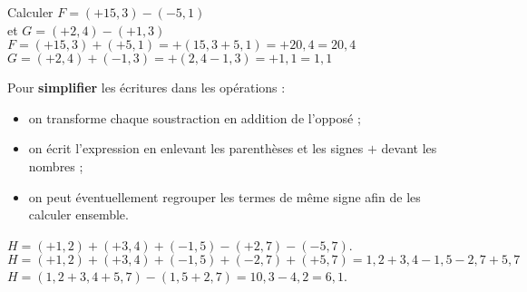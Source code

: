 \begin{exemple}
   Calculer $F =(+15,3)-(-5,1)$ \\
   et $G =(+2,4)-(+1,3)$
   \correction 
      $F =(+15,3)+(+5,1) =+(15,3+5,1) =+20,4 =20,4$ \\
      $G =(+2,4)+(-1,3) =+(2,4-1,3) =+1,1 =1,1$
\end{exemple}

\smallskip

\begin{methode*1}
   Pour {\bf simplifier} les écritures dans les opérations :
   \begin{itemize}
      \item on transforme chaque soustraction en addition de l'opposé ;
      \item on écrit l'expression en enlevant les parenthèses et les signes $+$ devant les nombres ;
      \item on peut éventuellement regrouper les termes de même signe afin de les calculer ensemble.
   \end{itemize}
   \exercice
      $H =(+1,2)+(+3,4)+(-1,5)-(+2,7)-(-5,7)$.
   \correction
      $H =(+1,2)+(+3,4)+(-1,5)+(-2,7)+(+5,7) =1,2+3,4-1,5-2,7+5,7$ \\
      $H =(1,2+3,4+5,7)-(1,5+2,7) =10,3-4,2 =6,1$.
\end{methode*1}


\exercicesbase

